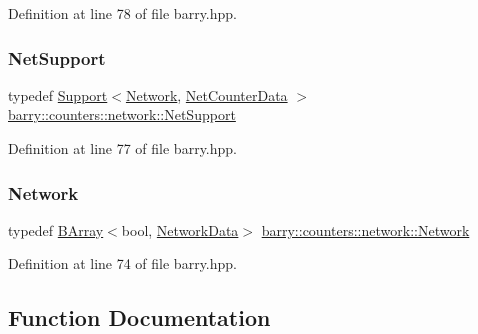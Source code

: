 Definition at line 78 of file barry.\+hpp.

\mbox{\label{namespacebarry_1_1counters_1_1network_a4d30be7f465efd7d218f0264f8386b32}} 
\subsubsection{\texorpdfstring{Net\+Support}{NetSupport}}
{\footnotesize\ttfamily typedef \hyperlink{classbarry_1_1_support}{Support}$<$\hyperlink{namespacebarry_1_1counters_1_1network_a4cb88d4572ded3b447ea269c9cd0b2c0}{Network}, \hyperlink{classbarry_1_1counters_1_1network_1_1_net_counter_data}{Net\+Counter\+Data} $>$ \hyperlink{namespacebarry_1_1counters_1_1network_a4d30be7f465efd7d218f0264f8386b32}{barry\+::counters\+::network\+::\+Net\+Support}}



Definition at line 77 of file barry.\+hpp.

\mbox{\label{namespacebarry_1_1counters_1_1network_a4cb88d4572ded3b447ea269c9cd0b2c0}} 
\subsubsection{\texorpdfstring{Network}{Network}}
{\footnotesize\ttfamily typedef \hyperlink{classbarry_1_1_b_array}{B\+Array}$<$bool, \hyperlink{classbarry_1_1counters_1_1network_1_1_network_data}{Network\+Data}$>$ \hyperlink{namespacebarry_1_1counters_1_1network_a4cb88d4572ded3b447ea269c9cd0b2c0}{barry\+::counters\+::network\+::\+Network}}



Definition at line 74 of file barry.\+hpp.



\subsection{Function Documentation}
\mbox{\label{namespacebarry_1_1counters_1_1network_acc210d80021cb5a79f1a9daf097e1c99}} 
